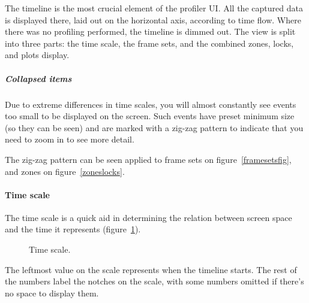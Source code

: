 \documentclass[hidelinks,titlepage,a4paper]{article}
\begin{document}
The timeline is the most crucial element of the profiler UI. All the captured data is displayed there, laid out on the horizontal axis, according to time flow. Where there was no profiling performed, the timeline is dimmed out. The view is split into three parts: the time scale, the frame sets, and the combined zones, locks, and plots display.

\subparagraph{Collapsed items}
\label{collapseditems}

Due to extreme differences in time scales, you will almost constantly see events too small to be displayed on the screen. Such events have preset minimum size (so they can be seen) and are marked with a zig-zag pattern to indicate that you need to zoom in to see more detail.

The zig-zag pattern can be seen applied to frame sets on figure~\ref{framesetsfig}, and zones on figure~\ref{zoneslocks}.

\paragraph{Time scale}

The time scale is a quick aid in determining the relation between screen space and the time it represents (figure~\ref{timescale}).

\begin{figure}[h]
\centering{}
\caption{Time scale.}
\label{timescale}
\end{figure}

The leftmost value on the scale represents when the timeline starts. The rest of the numbers label the notches on the scale, with some numbers omitted if there's no space to display them.
\end{document}
